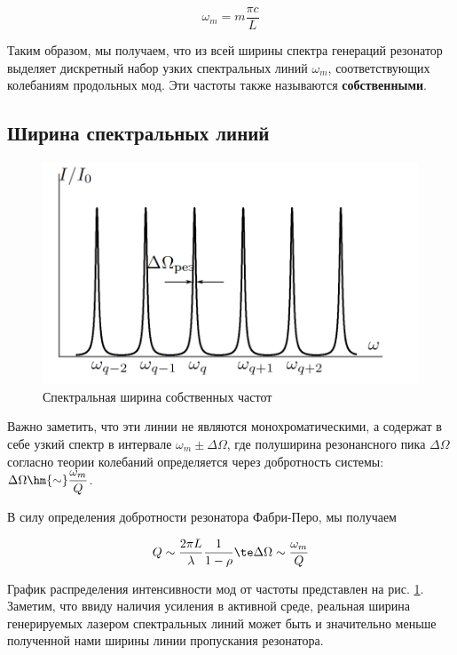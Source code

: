 \documentclass[12pt]{kiarticle}
\begin{document}
\begin{equation}\label{omega_m}
\omega_m = m \dfrac{\pi c}{L}
\end{equation}

Таким образом, мы получаем, что из всей ширины спектра генераций резонатор выделяет дискретный набор узких спектральных линий $ \omega_m $, соответствующих колебаниям продольных мод. Эти частоты также называются \textbf{собственными}. 

\subsection{Ширина спектральных линий}

\begin{figure} 
	\includegraphics[width=\linewidth]{piks.png}
	\caption{Спектральная ширина собственных частот}
	\label{piks}
\end{figure}

Важно заметить, что эти линии не являются монохроматическими, а содержат в себе узкий спектр в интервале $ \omega_m \pm \Delta \Omega $, где полуширина резонансного пика $ \Delta \Omega $ согласно теории колебаний определяется через добротность системы: $ \Delta \Omega \hm{\sim} \dfrac{\omega_m}{Q} $. 

В силу определения добротности резонатора Фабри-Перо, мы получаем 

\begin{equation}\label{Q}
Q \sim \dfrac{2\pi L}{\lambda} \dfrac{1}{1 - \rho} \te \Delta \Omega \sim \dfrac{\omega_m}{Q}
\end{equation}

График распределения интенсивности мод от частоты представлен на рис. \ref{piks}. Заметим, что ввиду наличия усиления в активной среде, реальная ширина генерируемых лазером спектральных линий может быть
и значительно меньше полученной нами ширины линии пропускания резонатора. 
\end{document}
